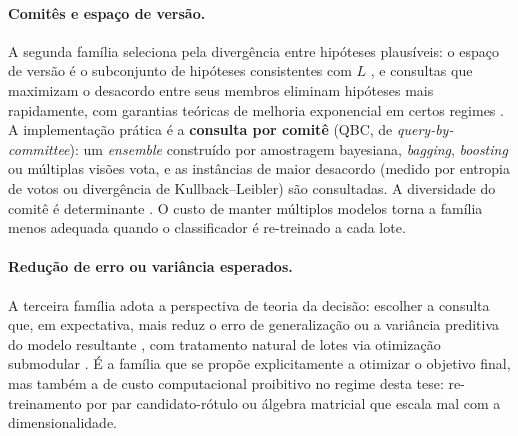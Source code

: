 \paragraph{Comitês e espaço de versão.} A segunda família seleciona pela
divergência entre hipóteses plausíveis: o espaço de versão é o subconjunto de
hipóteses consistentes com $L$ \citep{Mitchell1982}, e consultas que maximizam
o desacordo entre seus membros eliminam hipóteses mais rapidamente, com
garantias teóricas de melhoria exponencial em certos regimes
\citep{Cohn1994Improving, Hanneke2015}. A implementação prática é a \textbf{consulta por comitê} (QBC, de \textit{query-by-committee}): um \textit{ensemble} construído por
amostragem bayesiana, \textit{bagging}, \textit{boosting} ou múltiplas visões
\citep{Seung1992, Freund1997, McCallum1998, Abe1998, Muslea2000, Blum1998}
vota, e as instâncias de maior desacordo (medido por entropia de votos ou
divergência de Kullback--Leibler) são consultadas. A diversidade do comitê é
determinante \citep{Melville2004}. O custo de manter múltiplos modelos torna a família menos adequada quando o classificador é re-treinado a cada
lote.

\paragraph{Redução de erro ou variância esperados.} A terceira família adota a
perspectiva de teoria da decisão: escolher a consulta que, em expectativa,
mais reduz o erro de generalização ou a variância preditiva do modelo
resultante \citep{Roy2001, MacKay1992, Cohn1996}, com tratamento natural de
lotes via otimização submodular \citep{Guestrin2005, Golovin2011, Krause2014}.
É a família que se propõe explicitamente a otimizar o objetivo final, mas também a de custo computacional proibitivo no regime desta tese: re-treinamento por par
candidato-rótulo ou álgebra matricial que escala mal com a dimensionalidade.

